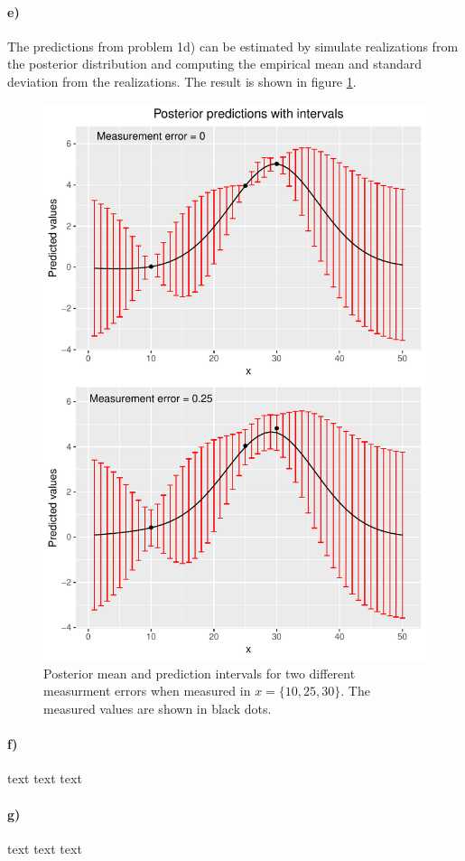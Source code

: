 \paragraph{e)}

The predictions from problem 1d) can be estimated by simulate realizations from the posterior distribution and computing the empirical mean and standard deviation from the realizations. 
The result is shown in figure \ref{fig:postSamps}.

\begin{figure}
    \centering
    \includegraphics{figures/predictions.pdf}
    \caption{Posterior mean and prediction intervals for two different measurment errors when measured in $x = \{10,25,30\}$. The measured values are shown in black dots.}
    \label{fig:postSamps}
\end{figure}


\paragraph{f)}
text text text

\paragraph{g)}
text text text
